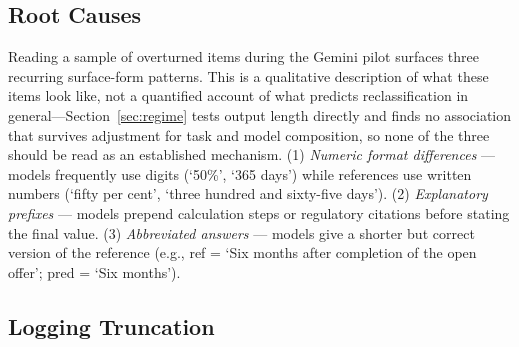 \subsection{Root Causes}

Reading a sample of overturned items during the Gemini pilot surfaces three recurring surface-form patterns. This is a qualitative description of what these items look like, not a quantified account of what predicts reclassification in general---Section~\ref{sec:regime} tests output length directly and finds no association that survives adjustment for task and model composition, so none of the three should be read as an established mechanism. (1) \textit{Numeric format differences} --- models frequently use digits (`50\%', `365 days') while references use written numbers (`fifty per cent', `three hundred and sixty-five days'). (2) \textit{Explanatory prefixes} --- models prepend calculation steps or regulatory citations before stating the final value. (3) \textit{Abbreviated answers} --- models give a shorter but correct version of the reference (e.g., ref = `Six months after completion of the open offer'; pred = `Six months').

\subsection{Logging Truncation}
\label{app:truncation}

